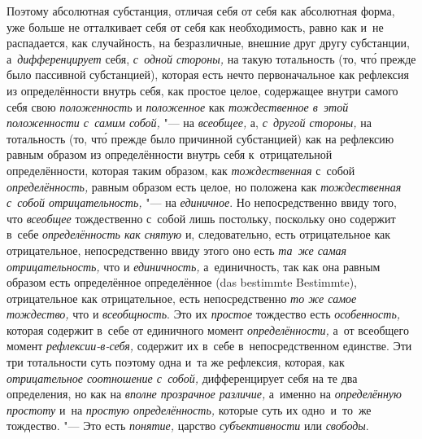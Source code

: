Поэтому абсолютная субстанция, отличая себя от себя как абсолютная форма, уже
больше не отталкивает себя от себя как необходимость, равно как и~не
распадается, как случайность, на безразличные, внешние друг другу субстанции,
а~{\em дифференцирует} себя, {\em с~одной стороны,} на такую тотальность
(то, чт\'{о} прежде было пассивной субстанцией), которая есть нечто
первоначальное как рефлексия из определённости внутрь себя, как простое целое,
содержащее внутри самого себя свою {\em положенность} и {\em положенное} как
{\em тождественное в~этой положенности с~самим собой,} "--- на {\em всеобщее,}
а, {\em с~другой стороны,} на тотальность (то, чт\'{о} прежде было причинной
субстанцией) как на рефлексию равным образом из определённости внутрь себя
к~отрицательной определённости, которая таким образом, как {\em тождественная}
с~собой {\em определённость,} равным образом есть целое, но положена как
{\em тождественная с~собой отрицательность,} "--- на {\em единичное}. Но
непосредственно ввиду того, что {\em всеобщее} тождественно с~собой лишь
постольку, поскольку оно содержит в~себе {\em определённость как снятую} и,
следовательно, есть отрицательное как отрицательное, непосредственно ввиду
этого оно есть {\em та~же самая отрицательность,} что и {\em единичность,}
а~единичность, так как она равным образом есть определённое определённое
(das bestimmte Bestimmte), отрицательное как отрицательное, есть
непосредственно {\em то же самое тождество,} что и {\em всеобщность}. Это их
{\em простое} тождество есть {\em особенность,} которая содержит в~себе от
единичного момент {\em определённости,} а~от всеобщего момент
{\em рефлексии-в-себя,} содержит их в~себе в~непосредственном единстве.
Эти три тотальности суть поэтому одна и~та же рефлексия, которая, как
{\em отрицательное соотношение с~собой,} дифференцирует себя на те два
определения, но как на {\em вполне прозрачное различие,} а~именно на
{\em определённую простоту} и~на {\em простую определённость,} которые
суть их одно~и~то~же тождество. "--- Это есть {\em понятие,} царство
{\em субъективности} или {\em свободы}.

\bigskip
